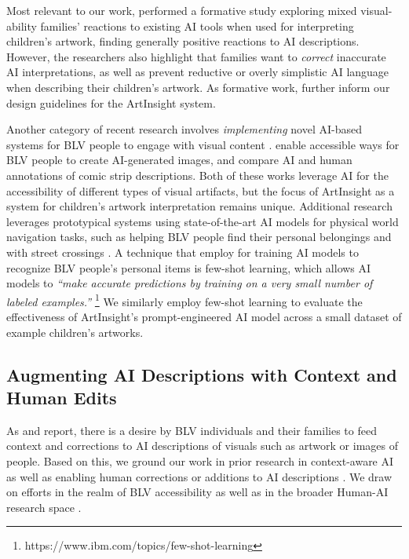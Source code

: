 \documentclass[sigconf]{acmart}
\begin{document}
Most relevant to our work, \citet{chhedakothary2024} performed a formative study exploring mixed visual-ability families' reactions to existing AI tools when used for interpreting children's artwork, finding generally positive reactions to AI descriptions. However, the researchers also highlight that families want to \textit{correct} inaccurate AI interpretations, as well as prevent reductive or overly simplistic AI language when describing their children's artwork. As formative work, \citet{chhedakothary2024} further inform our design guidelines for the ArtInsight system. 

Another category of recent research involves \textit{implementing} novel AI-based systems for BLV people to engage with visual content \cite{Huh_GenAssist, Kim_DescriptionsForComics}. \citet{Huh_GenAssist} enable accessible ways for BLV people to create AI-generated images, and \citet{Kim_DescriptionsForComics} compare AI and human annotations of comic strip descriptions. Both of these works leverage AI for the accessibility of different types of visual artifacts, but the focus of ArtInsight as a system for children's artwork interpretation remains unique. Additional research leverages prototypical systems using state-of-the-art AI models for physical world navigation tasks, such as helping BLV people find their personal belongings \cite{Morrison_FindMyThings} and with street crossings \cite{jain2024streetnavleveragingstreetcameras}. A technique that \citet{Morrison_FindMyThings} employ for training AI models to recognize BLV people's personal items is few-shot learning, which allows AI models to \textit{``make accurate predictions by training on a very small number of labeled examples.''} \footnote{https://www.ibm.com/topics/few-shot-learning} We similarly employ few-shot learning to evaluate the effectiveness of ArtInsight's prompt-engineered AI model across a small dataset of example children's artworks.

\subsection{Augmenting AI Descriptions with Context and Human Edits}
As \citet{chhedakothary2024} and \citet{bennett_itscomplicated} report, there is a desire by BLV individuals and their families to feed context and corrections to AI descriptions of visuals such as artwork or images of people. Based on this, we ground our work in prior research in context-aware AI \cite{Gubbi_ContextAware} as well as enabling human corrections or additions to AI descriptions \cite{be_my_eyes_2024, darth_vader}. We draw on efforts in the realm of BLV accessibility \cite{Lee_RSAs, be_my_eyes_2024, Gubbi_ContextAware, Singh_FigureA11y} as well as in the broader Human-AI research space \cite{darth_vader, hwang_creative}.
\end{document}
